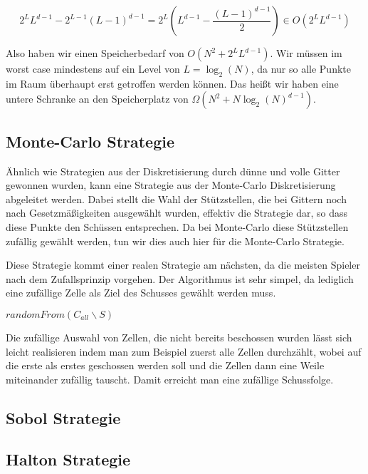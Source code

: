 \documentclass[a4paper,12pt]{llncs}
\numberwithin{equation}{section}
\begin{document}
\begin{equation}
2^LL^{d-1}-2^{L-1}(L-1)^{d-1}=2^L\left(L^{d-1}-\frac{(L-1)^{d-1}}{2}\right)\in O(2^LL^{d-1})
\end{equation}

Also haben wir einen Speicherbedarf von $O(N^2+2^LL^{d-1})$. Wir müssen im worst case mindestens auf ein Level von $L=\log_2(N)$, da nur so alle Punkte im Raum überhaupt erst getroffen werden können. Das heißt wir haben eine untere Schranke an den Speicherplatz von $\Omega(N^2+N\log_2(N)^{d-1})$.


\subsection{Monte-Carlo Strategie}

Ähnlich wie Strategien aus der Diskretisierung durch dünne und volle Gitter gewonnen wurden, kann eine Strategie aus der Monte-Carlo Diskretisierung abgeleitet werden. Dabei stellt die Wahl der Stützstellen, die bei Gittern noch nach Gesetzmäßigkeiten ausgewählt wurden, effektiv die Strategie dar, so dass diese Punkte den Schüssen entsprechen. Da bei Monte-Carlo diese Stützstellen zufällig gewählt werden, tun wir dies auch hier für die Monte-Carlo Strategie. 

Diese Strategie kommt einer realen Strategie am nächsten, da die meisten Spieler nach dem Zufallsprinzip vorgehen. Der Algorithmus ist sehr simpel, da lediglich eine zufällige Zelle als Ziel des Schusses gewählt werden muss.

\begin{tcolorbox}
	\begin{algorithmic}
		\State \Return $randomFrom(C_{all}\backslash S)$
		\EndFunction
	\end{algorithmic}
\end{tcolorbox}

Die zufällige Auswahl von Zellen, die nicht bereits beschossen wurden lässt sich leicht realisieren indem man zum Beispiel zuerst alle Zellen durchzählt, wobei auf die erste als erstes geschossen werden soll und die Zellen dann eine Weile miteinander zufällig tauscht. Damit erreicht man eine zufällige Schussfolge.


\subsection{Sobol Strategie}

\subsection{Halton Strategie}
\end{document}
